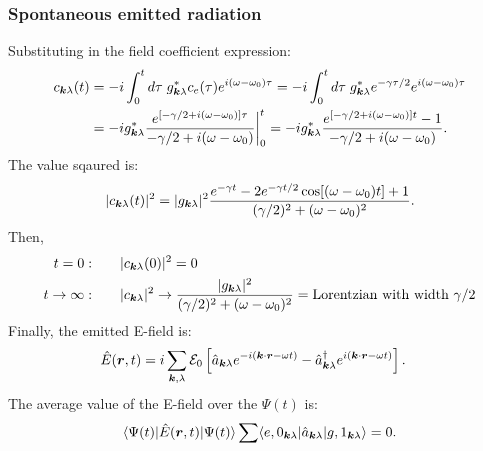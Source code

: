 \subsubsection{Spontaneous emitted radiation}
Substituting in the field coefficient expression:
\begin{align*}
    c_{\bm{k}\lambda}(t)&=-i\int_0^td\tau\;g^*_{\bm{k}\lambda}c_e(\tau)e^{i(\omega-\omega_0)\tau}
    =-i\int_0^td\tau\;g^*_{\bm{k}\lambda}e^{-\gamma\tau/2}e^{i(\omega-\omega_0)\tau}\\
    &=-ig^*_{\bm{k}\lambda}\frac{e^{[-\gamma/2+i(\omega-\omega_0)]\tau}}{-\gamma/2+i(\omega-\omega_0)}\biggr|_0^t
    =-ig^*_{\bm{k}\lambda}\frac{e^{[-\gamma/2+i(\omega-\omega_0)]t}-1}{-\gamma/2+i(\omega-\omega_0)}.
\end{align*}
The value sqaured is:
\begin{align*}
    |c_{\bm{k}\lambda}(t)|^2=|g_{\bm{k}\lambda}|^2\frac{e^{-\gamma t}-2e^{-\gamma t/2}\cos[(\omega-\omega_0)t]+1}{(\gamma/2)^2+(\omega-\omega_0)^2}.
\end{align*}
Then,
\begin{align*}
    t=0:&\qquad |c_{\bm{k}\lambda}(0)|^2=0\\
    t\to\infty:&\qquad|c_{\bm{k}\lambda}|^2\to\frac{|g_{\bm{k}\lambda}|^2}{(\gamma/2)^2+(\omega-\omega_0)^2}=\text{Lorentzian with width $\gamma/2$}
\end{align*}
Finally, the emitted E-field is:
\begin{align*}
    \hat{E}(\bm{r},t)&=i\sum_{\bm{k},\lambda}\mathcal{E}_0\left[\hat{a}_{\bm{k}\lambda}e^{-i(\bm{k}\cdot\bm{r}-\omega t)}-\hat{a}^\dagger_{\bm{k}\lambda}e^{i(\bm{k}\cdot\bm{r}-\omega t)}\right].
\end{align*}
The average value of the E-field over the $\Psi(t)$ is:
\begin{align*}
    \langle\Psi(t)|\hat{E}(\bm{r},t)|\Psi(t)\rangle\sum\langle e,0_{\bm{k}\lambda}|\hat{a}_{\bm{k}\lambda}|g,1_{\bm{k}\lambda}\rangle=0.
\end{align*}